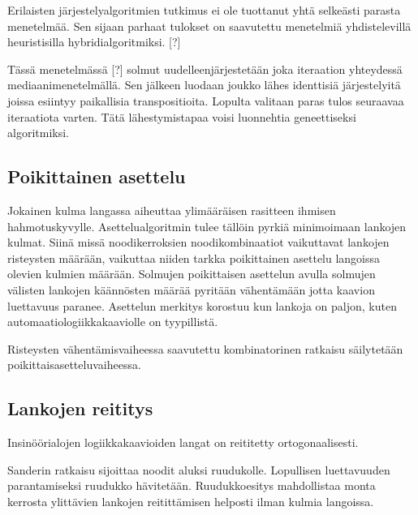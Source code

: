 \documentclass[finnish,12pt]{article}
\begin{document}

Erilaisten järjestelyalgoritmien tutkimus ei ole tuottanut yhtä selkeästi parasta menetelmää.
Sen sijaan parhaat tulokset on saavutettu menetelmiä yhdistelevillä heuristisilla hybridialgoritmiksi. [?]

Tässä menetelmässä [?] solmut uudelleenjärjestetään joka iteraation yhteydessä mediaanimenetelmällä.
Sen jälkeen luodaan joukko lähes identtisiä järjestelyitä joissa esiintyy paikallisia transpositioita.
Lopulta valitaan paras tulos seuraavaa iteraatiota varten.
Tätä lähestymistapaa voisi luonnehtia geneettiseksi algoritmiksi.


		\subsection{Poikittainen asettelu}

Jokainen kulma langassa aiheuttaa ylimääräisen rasitteen ihmisen hahmotuskyvylle. \cite{RefWorks:47}
Asettelualgoritmin tulee tällöin pyrkiä minimoimaan lankojen kulmat.
Siinä missä noodikerroksien noodikombinaatiot vaikuttavat lankojen risteysten määrään, vaikuttaa niiden tarkka poikittainen asettelu langoissa olevien kulmien määrään.
Solmujen poikittaisen asettelun avulla solmujen välisten lankojen käännösten määrää pyritään vähentämään jotta kaavion luettavuus paranee.
Asettelun merkitys korostuu kun lankoja on paljon, kuten automaatiologiikkakaaviolle on tyypillistä.

Risteysten vähentämisvaiheessa saavutettu kombinatorinen ratkaisu säilytetään poikittaisasetteluvaiheessa.

		\subsection{Lankojen reititys}

Insinöörialojen logiikkakaavioiden langat on reititetty ortogonaalisesti.

Sanderin ratkaisu sijoittaa noodit aluksi ruudukolle. Lopullisen luettavuuden parantamiseksi ruudukko hävitetään. Ruudukkoesitys mahdollistaa monta kerrosta ylittävien lankojen reitittämisen helposti ilman kulmia langoissa.
\cite{RefWorks:17}
\end{document}
